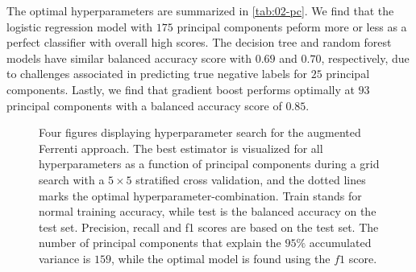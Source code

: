 The optimal hyperparameters are summarized in \autoref{tab:02-pc}. We find that the logistic regression model with $175$ principal components peform more or less as a perfect classifier with overall high scores. The decision tree and random forest models have similar balanced accuracy score with $0.69$ and $0.70$, respectively, due to challenges associated in predicting true negative labels for $25$ principal components. Lastly, we find that gradient boost performs optimally at $93$ principal components with a balanced accuracy score of $0.85$.

\begin{figure}[ht!]
  \begin{subfigure}[b]{1.0\textwidth}
    \centering
    
  \end{subfigure}
\par\bigskip
  \begin{subfigure}[b]{0.5\textwidth}
    
    \caption{}
    \label{fig:q2-LOG}
  \end{subfigure}%
  \hfill
  \begin{subfigure}[b]{0.5\textwidth}
    
    \caption{}
    \label{fig:q2-DT}
  \end{subfigure}

  \begin{subfigure}[b]{0.5\textwidth}
    
    \caption{}
    \label{fig:q2-RF}
  \end{subfigure}%
  \hfill
  \begin{subfigure}[b]{0.5\textwidth}
    
    \caption{}
    \label{fig:q2-GB}
  \end{subfigure}
  \vspace*{-130mm}
  \caption{{Four figures displaying hyperparameter search for the augmented Ferrenti approach. The best estimator is visualized for all hyperparameters as a function of principal components during a grid search with a $5\times5$ stratified cross validation, and the dotted lines marks the optimal hyperparameter-combination. Train stands for normal training accuracy, while test is the balanced accuracy on the test set. Precision, recall and f1 scores are based on the test set. The number of principal components that explain the $95\%$ accumulated variance is $159$, while the optimal model is found using the $f1$ score.}}
  \label{fig:02-pca}
\end{figure}

